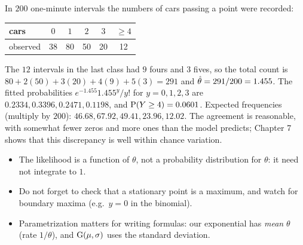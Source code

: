 \begin{example}
In $200$ one-minute intervals the numbers of cars passing a point were recorded:
\begin{center}
\begin{tabular}{lccccc}
\toprule
cars & $0$ & $1$ & $2$ & $3$ & $\ge 4$ \\
\midrule
observed & 38 & 80 & 50 & 20 & 12 \\
\bottomrule
\end{tabular}
\end{center}
The $12$ intervals in the last class had $9$ fours and $3$ fives, so the total count is
$80 + 2(50) + 3(20) + 4(9) + 5(3) = 291$ and $\hat{\theta} = 291/200 = 1.455$. The fitted
probabilities $e^{-1.455}1.455^y/y!$ for $y=0,1,2,3$ are $0.2334, 0.3396, 0.2471,
0.1198$, and $\operatorname{P}(Y\ge4) = 0.0601$. Expected frequencies (multiply by $200$):
$46.68, 67.92, 49.41, 23.96, 12.02$. The agreement is reasonable, with somewhat fewer
zeros and more ones than the model predicts; Chapter 7 shows that this discrepancy is
well within chance variation.
\end{example}

\begin{center}
\end{center}

\begin{important}
\begin{itemize}
  \item The likelihood is a function of $\theta$, not a probability distribution for
        $\theta$: it need not integrate to $1$.
  \item Do not forget to check that a stationary point is a maximum, and watch for
        boundary maxima (e.g.\ $y=0$ in the binomial).
  \item Parametrization matters for writing formulas: our exponential has
        \emph{mean} $\theta$ (rate $1/\theta$), and $\operatorname{G}(\mu,\sigma)$ uses the standard
        deviation.
\end{itemize}
\end{important}

